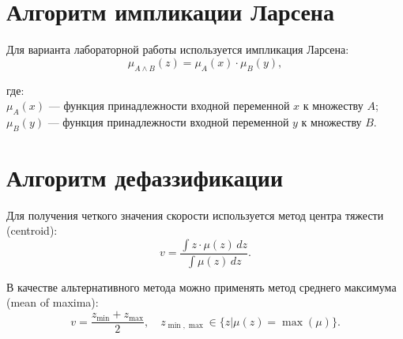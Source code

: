 \section{Алгоритм импликации Ларсена}

Для варианта лабораторной работы используется импликация Ларсена:
\begin{equation*}
    \mu_{A \wedge B}(z) = \mu_A(x) \cdot \mu_B(y),
\end{equation*}

где:\\
$\mu_A(x)$ — функция принадлежности входной переменной $x$ к множеству $A$;\\
$\mu_B(y)$ — функция принадлежности входной переменной $y$ к множеству $B$.

    \section{Алгоритм дефаззификации}

Для получения четкого значения скорости используется метод центра тяжести (centroid):
\[
v = \frac{\int z \cdot \mu(z) \, dz}{\int \mu(z) \, dz}.
\]

В качестве альтернативного метода можно применять метод среднего максимума (mean of maxima):
\[
v = \frac{z_{\min} + z_{\max}}{2}, \quad z_{\min,\max} \in \{z | \mu(z) = \max(\mu)\}.
\]
